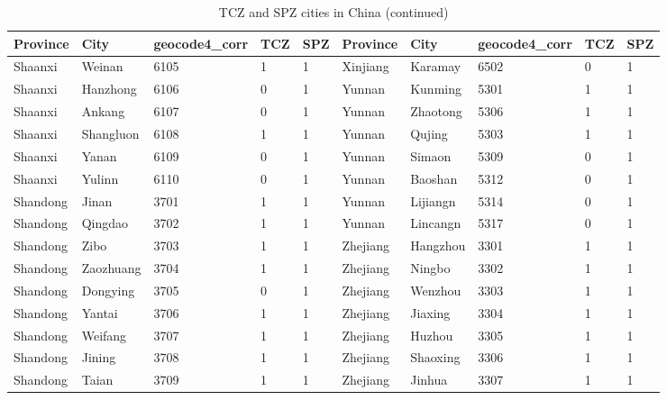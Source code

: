 \begin{table}[!htbp] \centering
  \caption{TCZ and SPZ cities in China (continued)}
  \begin{adjustbox}{width=\textwidth, totalheight=\baselineskip,keepaspectratio}
    \label{tab:appendix3}
\begin{tabular}{llllllllll}
\hline
Province       & City         & geocode4\_corr & TCZ & SPZ & Province & City        & geocode4\_corr & TCZ & SPZ \\
\hline
Shaanxi  & Weinan    & 6105           & 1   & 1   & Xinjiang & Karamay  & 6502           & 0   & 1   \\
Shaanxi  & Hanzhong  & 6106           & 0   & 1   & Yunnan   & Kunming  & 5301           & 1   & 1   \\
Shaanxi  & Ankang    & 6107           & 0   & 1   & Yunnan   & Zhaotong & 5306           & 1   & 1   \\
Shaanxi  & Shangluon & 6108           & 1   & 1   & Yunnan   & Qujing   & 5303           & 1   & 1   \\
Shaanxi  & Yanan     & 6109           & 0   & 1   & Yunnan   & Simaon   & 5309           & 0   & 1   \\
Shaanxi  & Yulinn    & 6110           & 0   & 1   & Yunnan   & Baoshan  & 5312           & 0   & 1   \\
Shandong & Jinan     & 3701           & 1   & 1   & Yunnan   & Lijiangn & 5314           & 0   & 1   \\
Shandong & Qingdao   & 3702           & 1   & 1   & Yunnan   & Lincangn & 5317           & 0   & 1   \\
Shandong & Zibo      & 3703           & 1   & 1   & Zhejiang & Hangzhou & 3301           & 1   & 1   \\
Shandong & Zaozhuang & 3704           & 1   & 1   & Zhejiang & Ningbo   & 3302           & 1   & 1   \\
Shandong & Dongying  & 3705           & 0   & 1   & Zhejiang & Wenzhou  & 3303           & 1   & 1   \\
Shandong & Yantai    & 3706           & 1   & 1   & Zhejiang & Jiaxing  & 3304           & 1   & 1   \\
Shandong & Weifang   & 3707           & 1   & 1   & Zhejiang & Huzhou   & 3305           & 1   & 1   \\
Shandong & Jining    & 3708           & 1   & 1   & Zhejiang & Shaoxing & 3306           & 1   & 1   \\
Shandong & Taian     & 3709           & 1   & 1   & Zhejiang & Jinhua   & 3307           & 1   & 1   \\

\end{tabular}
\end{adjustbox}
\end{table}
